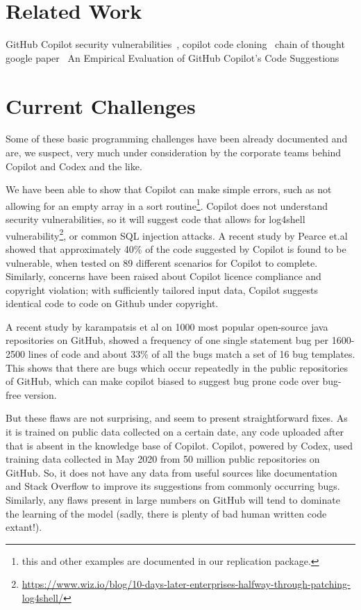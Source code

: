 \label{chapter:background}

\newlength{\savedunitlength}
\setlength{\unitlength}{2em}



\setlength{\unitlength}{\savedunitlength}

\section{Related Work}
GitHub Copilot security vulnerabilities~\cite{copilot_security}, copilot code cloning~\cite{code_clone}
chain of thought google paper~\cite{chain_of_thought}
An Empirical Evaluation of GitHub Copilot's Code Suggestions~\cite{empirical_eval}

\section{Current Challenges}
Some of these basic programming challenges have been already documented and are, we suspect, very much under consideration by the corporate teams behind Copilot and Codex and the like. 

We have been able to show that Copilot can make simple errors, such as not allowing for an empty array in a sort routine\footnote{this and other examples are documented in our replication package.}. Copilot does not understand security vulnerabilities, so it will suggest code that allows for \textsf{log4shell} vulnerability\footnote{\url{https://www.wiz.io/blog/10-days-later-enterprises-halfway-through-patching-log4shell/}}, or common SQL injection attacks. A recent study by Pearce et.al \cite{copilot_security} showed that approximately 40\% of the code suggested by Copilot is found to be vulnerable, when tested on 89 different scenarios for Copilot to complete.
Similarly, concerns have been raised about Copilot licence compliance and copyright violation; with sufficiently tailored input data, Copilot suggests identical code to code on Github under copyright. 

A recent study by karampatsis et al \cite{github_bugs} on 1000 most popular open-source java repositories on GitHub, showed a frequency of one single statement bug per 1600-2500 lines of code and about 33\% of all the bugs match a set of 16 bug templates. This shows that there are bugs which occur repeatedly in the public repositories of GitHub, which can make copilot biased to suggest bug prone code over bug-free version.

But these flaws are not surprising, and seem to present straightforward fixes.
As it is trained on public data collected on a certain date, any code uploaded after that is absent in the knowledge base of Copilot. Copilot, powered by Codex, used training data collected in May 2020 from 50 million public repositories on GitHub\cite{copilot}. So, it does not have any data from useful sources like documentation and Stack Overflow to improve its suggestions from commonly occurring bugs.
Similarly, any flaws present in large numbers on GitHub will tend to dominate the learning of the model (sadly, there is plenty of bad human written code extant!).

